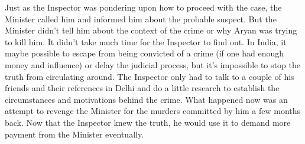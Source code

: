 Just as the Inspector was pondering upon how to proceed with the case, the
Minister called him and informed him about the probable suspect. But the
Minister didn't tell him about the context of the crime or why Aryan was trying
to kill him. It didn't take much time for the Inspector to find out. In India,
it maybe possible to escape from being convicted of a crime (if one had enough
money and influence) or delay the judicial process, but it's impossible to stop
the truth from circulating around. The Inspector only had to talk to a couple of
his friends and their references in Delhi and do a little research to establish
the circumstances and motivations behind the crime. What happened now was an
attempt to revenge the Minister for the murders committed by him a few months
back. Now that the Inspector knew the truth, he would use it to demand more
payment from the Minister eventually.